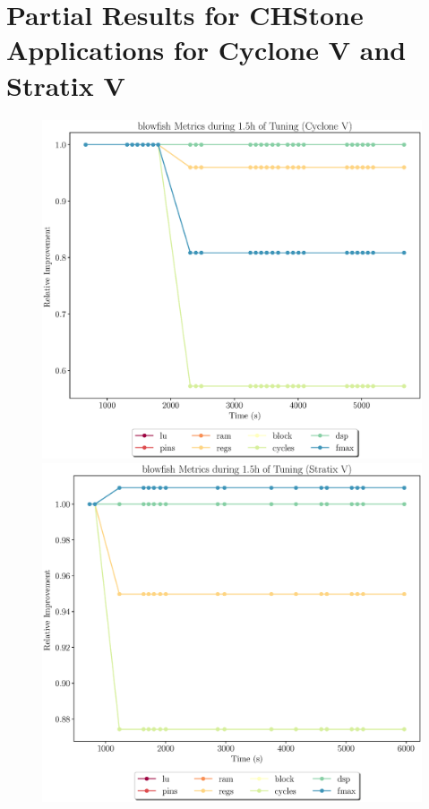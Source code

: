 \documentclass[12pt, a4paper]{article}
\begin{document}
\section{Partial Results for CHStone Applications for Cyclone V and Stratix V}

\noindent

\begin{figure}[htpb]
    \centering
    \noindent
    \begin{minipage}{.48\textwidth}
        \centering
        \includegraphics[scale=.25]{blowfish_all_5400_chstone_CycloneV}
    \end{minipage}%
    \hfill
    \begin{minipage}{.48\textwidth}
        \centering
        \includegraphics[scale=.25]{blowfish_all_5400_chstone_StratixV}
    \end{minipage}%


\end{figure}
\end{document}
